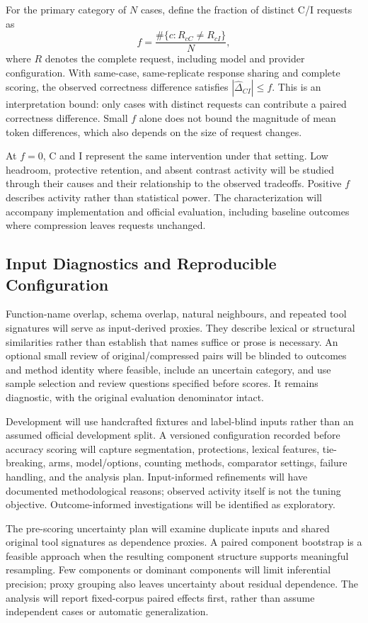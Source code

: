 \documentclass[conference]{IEEEtran}
\begin{document}
For the primary category of $N$ cases, define the fraction of distinct C/I requests as
\begin{equation}
f=\frac{\#\{c:R_{cC}\ne R_{cI}\}}{N},
\end{equation}
where $R$ denotes the complete request, including model and provider configuration. With same-case, same-replicate response sharing and complete scoring, the observed correctness difference satisfies $|\widehat{\Delta}_{CI}|\leq f$. This is an interpretation bound: only cases with distinct requests can contribute a paired correctness difference. Small $f$ alone does not bound the magnitude of mean token differences, which also depends on the size of request changes.

At $f=0$, C and I represent the same intervention under that setting. Low headroom, protective retention, and absent contrast activity will be studied through their causes and their relationship to the observed tradeoffs. Positive $f$ describes activity rather than statistical power. The characterization will accompany implementation and official evaluation, including baseline outcomes where compression leaves requests unchanged.

\subsection{Input Diagnostics and Reproducible Configuration}
Function-name overlap, schema overlap, natural neighbours, and repeated tool signatures will serve as input-derived proxies. They describe lexical or structural similarities rather than establish that names suffice or prose is necessary. An optional small review of original/compressed pairs will be blinded to outcomes and method identity where feasible, include an uncertain category, and use sample selection and review questions specified before scores. It remains diagnostic, with the original evaluation denominator intact.

Development will use handcrafted fixtures and label-blind inputs rather than an assumed official development split. A versioned configuration recorded before accuracy scoring will capture segmentation, protections, lexical features, tie-breaking, arms, model/options, counting methods, comparator settings, failure handling, and the analysis plan. Input-informed refinements will have documented methodological reasons; observed activity itself is not the tuning objective. Outcome-informed investigations will be identified as exploratory.

The pre-scoring uncertainty plan will examine duplicate inputs and shared original tool signatures as dependence proxies. A paired component bootstrap is a feasible approach when the resulting component structure supports meaningful resampling. Few components or dominant components will limit inferential precision; proxy grouping also leaves uncertainty about residual dependence. The analysis will report fixed-corpus paired effects first, rather than assume independent cases or automatic generalization.
\end{document}
